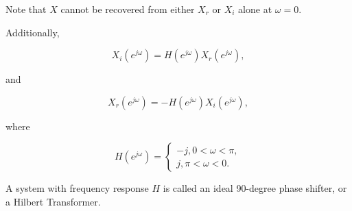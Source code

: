 Note that $X$ cannot be recovered from either $X_r$ or $X_i$ alone at $\omega = 0$.

Additionally,

\begin{equation}
	X_i(e^{j\omega}) = H(e^{j\omega})X_r(e^{j\omega}),
\end{equation}

and

\begin{equation}
	X_r(e^{j\omega}) = -H(e^{j\omega})X_i(e^{j\omega}),
\end{equation}

where

\begin{equation}
	H(e^{j\omega}) = \begin{cases}
		-j, 0 < \omega < \pi, \\
		j, \pi < \omega < 0.
	\end{cases}
\end{equation}

A system with frequency response $H$ is called an ideal 90-degree phase shifter, or a Hilbert Transformer.

